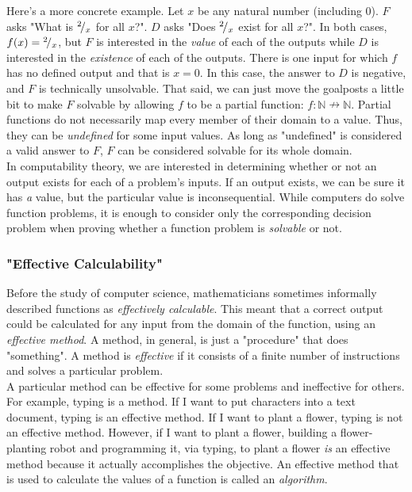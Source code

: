 Here's a more concrete example. Let $x$ be any natural number (including 0). $F$ asks "What is ${}^{2}\!/_{x}$ for all $x$?". $D$ asks "Does ${}^{2}\!/_{x}$ exist for all $x$?". In both cases, $f(x)={}^{2}\!/_{x}$, but $F$ is interested in the \textit{value} of each of the outputs while $D$ is interested in the \textit{existence} of each of the outputs. There is one input for which $f$ has no defined output and that is $x=0$. In this case, the answer to $D$ is negative, and $F$ is technically unsolvable. That said, we can just move the goalposts a little bit to make $F$ solvable by allowing $f$ to be a partial function: $f:\mathbb{N}\nrightarrow \mathbb{N}$. Partial functions do not necessarily map every member of their domain to a value. Thus, they can be \textit{undefined} for some input values. As long as "undefined" is considered a valid answer to $F$, $F$ can be considered solvable for its whole domain. \\

In computability theory, we are interested in determining whether or not an output exists for each of a problem's inputs. If an output exists, we can be sure it has \textit{a} value, but the particular value is inconsequential. While computers do solve function problems, it is enough to consider only the corresponding decision problem when proving whether a function problem is \textit{solvable} or not. \\

\subsubsection{"Effective Calculability"}

Before the study of computer science, mathematicians sometimes informally described functions as \textit{effectively calculable}. This meant that a correct output could be calculated for any input from the domain of the function, using an \textit{effective method}. A method, in general, is just a "procedure" that does "something". A method is \textit{effective} if it consists of a finite number of instructions and solves a particular problem. \\

A particular method can be effective for some problems and ineffective for others. For example, typing is a method. If I want to put characters into a text document, typing is an effective method. If I want to plant a flower, typing is not an effective method. However, if I want to plant a flower, building a flower-planting robot and programming it, via typing, to plant a flower \textit{is} an effective method because it actually accomplishes the objective. An effective method that is used to calculate the values of a function is called an \textit{algorithm}. \\

